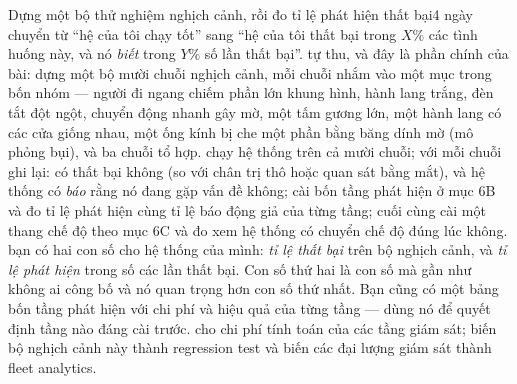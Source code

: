 \documentclass[../../vslam.tex]{subfiles}
\begin{document}
\begin{duan}{Dựng một bộ thử nghiệm nghịch cảnh, rồi đo tỉ lệ phát hiện thất bại}{4 ngày}
\dmt chuyển từ ``hệ của tôi chạy tốt'' sang ``hệ của tôi thất bại trong \(X\%\) các tình huống này, và nó \emph{biết} trong \(Y\%\) số lần thất bại''.
\ddl tự thu, và đây là phần chính của bài: dựng một bộ mười chuỗi nghịch cảnh, mỗi chuỗi nhắm vào một mục trong bốn nhóm --- người đi ngang chiếm phần lớn khung hình, hành lang trắng, đèn tắt đột ngột, chuyển động nhanh gây mờ, một tấm gương lớn, một hành lang có các cửa giống nhau, một ống kính bị che một phần bằng băng dính mờ (mô phỏng bụi), và ba chuỗi tổ hợp.
\dbc chạy hệ thống trên cả mười chuỗi; với mỗi chuỗi ghi lại: có thất bại không (so với chân trị thô hoặc quan sát bằng mắt), và hệ thống có \emph{báo} rằng nó đang gặp vấn đề không; cài bốn tầng phát hiện ở mục 6B và đo tỉ lệ phát hiện cùng tỉ lệ báo động giả của từng tầng; cuối cùng cài một thang chế độ theo mục 6C và đo xem hệ thống có chuyển chế độ đúng lúc không.
\dxk bạn có hai con số cho hệ thống của mình: \emph{tỉ lệ thất bại} trên bộ nghịch cảnh, và \emph{tỉ lệ phát hiện} trong số các lần thất bại. Con số thứ hai là con số mà gần như không ai công bố và nó quan trọng hơn con số thứ nhất. Bạn cũng có một bảng bốn tầng phát hiện với chi phí và hiệu quả của từng tầng --- dùng nó để quyết định tầng nào đáng cài trước.
\dnv {} cho chi phí tính toán của các tầng giám sát;  biến bộ nghịch cảnh này thành regression test và biến các đại lượng giám sát thành fleet analytics.
\end{duan}
\end{document}
